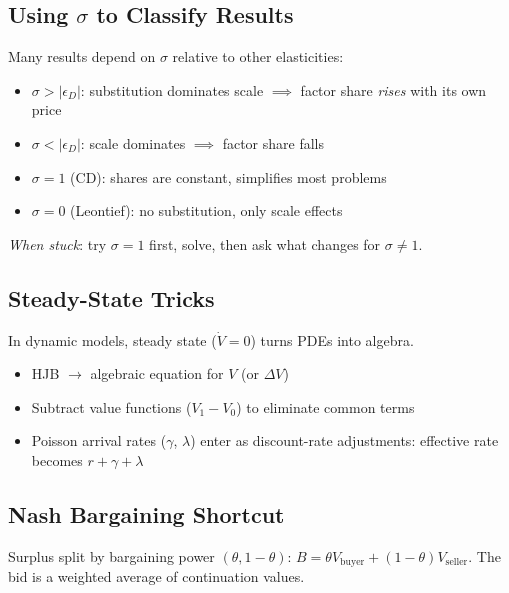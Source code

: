 \subsection{Using \texorpdfstring{$\sigma$}{sigma} to Classify Results}
Many results depend on $\sigma$ relative to other elasticities:
\begin{itemize}[nosep]
    \item $\sigma > |\epsilon_D|$: substitution dominates scale $\implies$ factor share \textit{rises} with its own price
    \item $\sigma < |\epsilon_D|$: scale dominates $\implies$ factor share falls
    \item $\sigma = 1$ (CD): shares are constant, simplifies most problems
    \item $\sigma = 0$ (Leontief): no substitution, only scale effects
\end{itemize}
\textit{When stuck}: try $\sigma = 1$ first, solve, then ask what changes for $\sigma \neq 1$.

\subsection{Steady-State Tricks}
In dynamic models, steady state ($\dot V = 0$) turns PDEs into algebra.
\begin{itemize}[nosep]
    \item HJB $\to$ algebraic equation for $V$ (or $\Delta V$)
    \item Subtract value functions ($V_1 - V_0$) to eliminate common terms
    \item Poisson arrival rates ($\gamma$, $\lambda$) enter as discount-rate adjustments: effective rate becomes $r + \gamma + \lambda$
\end{itemize}

\subsection{Nash Bargaining Shortcut}
Surplus split by bargaining power $(\theta, 1-\theta)$: $B = \theta V_{\text{buyer}} + (1-\theta) V_{\text{seller}}$. The bid is a weighted average of continuation values.
